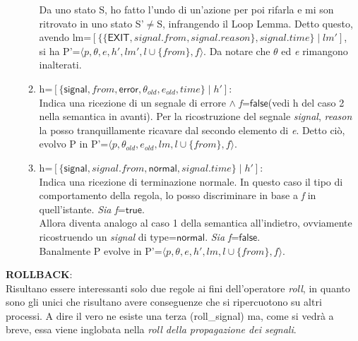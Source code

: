 \documentclass[Contributo.tex]{subfiles}
\begin{document}
\begin{itemize}
\begin{enumerate}
			  Da uno stato S, ho fatto l'undo di un'azione per poi rifarla e mi son ritrovato in uno stato S'$\neq$S, infrangendo il Loop Lemma.
			  Detto questo, avendo lm=$\displaystyle [\{\{\mathsf{EXIT},signal.from,signal.reason\},signal.time\} \mid lm']$, \\si ha P'=$\displaystyle \langle p,\theta,e,h',lm',l \cup \{from\},f \rangle$.
			  Da notare che $\theta$ ed \textit{e} rimangono inalterati.
		\item h=$\displaystyle [\{\mathsf{signal},from,\mathsf{error},\theta_{old},e_{old},time\} \mid h']$:\\
			  Indica una ricezione di un segnale di errore $\wedge$ \textit{f}=$\mathsf{false}$(vedi h del caso 2 nella semantica in avanti).
			  Per la ricostruzione del segnale \textit{signal}, \textit{reason} la posso tranquillamente ricavare dal secondo elemento di \textit{e}.
			  Detto ciò, evolvo P in P'=$\displaystyle \langle p,\theta_{old},e_{old},lm,l \cup \{from\},f \rangle$.
		\item h=$\displaystyle [\{\mathsf{signal},signal.from,\mathsf{normal},signal.time\} \mid h']$:\\
			  Indica una ricezione di terminazione normale.
			  In questo caso il tipo di comportamento della regola, lo posso discriminare in base a \textit{f} in quell'istante.
			  \textit{Sia f}=$\mathsf{true}$.\\
			  Allora diventa analogo al caso 1 della semantica all'indietro, ovviamente ricostruendo un \textit{signal} di type=$\mathsf{normal}$.
			  \textit{Sia f}=$\mathsf{false}$.\\
			  Banalmente P evolve in P'=$\displaystyle \langle p,\theta,e,h',lm,l \cup \{from\},f \rangle$.
	\end{enumerate}
	\end{itemize}
\textbf{ROLLBACK}:\\
	Risultano essere interessanti solo due regole ai fini dell'operatore \textit{roll}, in quanto sono gli unici che risultano avere conseguenze che si ripercuotono su altri processi.
	A dire il vero ne esiste una terza (roll\_signal) ma, come si vedrà a breve, essa viene inglobata nella \textit{roll della propagazione dei segnali}.
\end{document}
